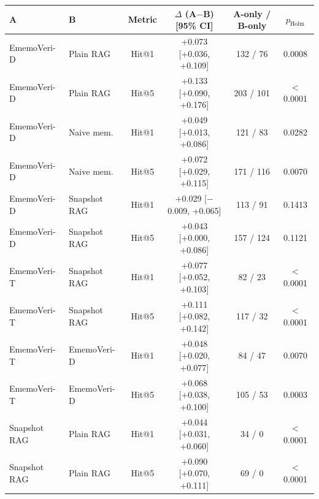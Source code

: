 \begin{tabular}{llcccc}
\toprule
A & B & Metric & $\Delta$ (A$-$B) [95\% CI] & A-only / B-only & $p_{\text{Holm}}$ \\
\midrule
EmemoVeri-D & Plain RAG & Hit@1 & +0.073 [+0.036, +0.109] & 132 / 76 & 0.0008 \\
EmemoVeri-D & Plain RAG & Hit@5 & +0.133 [+0.090, +0.176] & 203 / 101 & $<$0.0001 \\
\midrule
EmemoVeri-D & Naive mem. & Hit@1 & +0.049 [+0.013, +0.086] & 121 / 83 & 0.0282 \\
EmemoVeri-D & Naive mem. & Hit@5 & +0.072 [+0.029, +0.115] & 171 / 116 & 0.0070 \\
\midrule
EmemoVeri-D & Snapshot RAG & Hit@1 & +0.029 [$-$0.009, +0.065] & 113 / 91 & 0.1413 \\
EmemoVeri-D & Snapshot RAG & Hit@5 & +0.043 [+0.000, +0.086] & 157 / 124 & 0.1121 \\
\midrule
EmemoVeri-T & Snapshot RAG & Hit@1 & +0.077 [+0.052, +0.103] & 82 / 23 & $<$0.0001 \\
EmemoVeri-T & Snapshot RAG & Hit@5 & +0.111 [+0.082, +0.142] & 117 / 32 & $<$0.0001 \\
\midrule
EmemoVeri-T & EmemoVeri-D & Hit@1 & +0.048 [+0.020, +0.077] & 84 / 47 & 0.0070 \\
EmemoVeri-T & EmemoVeri-D & Hit@5 & +0.068 [+0.038, +0.100] & 105 / 53 & 0.0003 \\
\midrule
Snapshot RAG & Plain RAG & Hit@1 & +0.044 [+0.031, +0.060] & 34 / 0 & $<$0.0001 \\
Snapshot RAG & Plain RAG & Hit@5 & +0.090 [+0.070, +0.111] & 69 / 0 & $<$0.0001 \\
\bottomrule
\end{tabular}